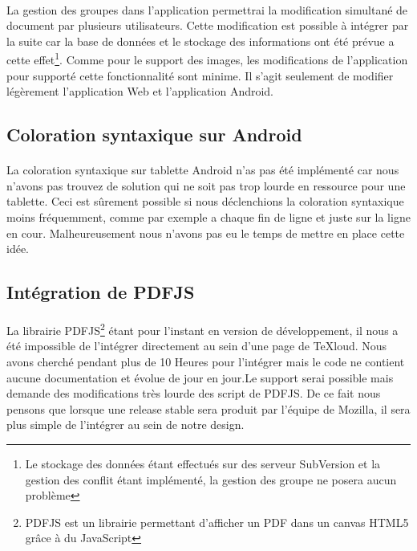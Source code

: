 \documentclass[a4paper,12pt]{article}
\begin{document}
\paragraph*{}
La gestion des groupes dans l'application permettrai la modification simultané de document par plusieurs utilisateurs. Cette modification est possible à intégrer par la suite car la base de données et le stockage des informations ont été prévue a cette effet\footnote{Le stockage des données étant effectués sur des serveur SubVersion et la gestion des conflit étant implémenté, la gestion des groupe ne posera aucun problème}. Comme pour le support des images, les modifications de l'application pour supporté cette fonctionnalité sont minime. Il s'agit seulement de modifier légèrement l'application Web et l'application Android.

\subsection{Coloration syntaxique sur Android}
\paragraph*{}
La coloration syntaxique sur tablette Android n'as pas été implémenté car nous n'avons pas trouvez de solution qui ne soit pas trop lourde en ressource pour une tablette. Ceci est sûrement possible si nous déclenchions la coloration syntaxique moins fréquemment, comme par exemple a chaque fin de ligne et juste sur la ligne en cour. Malheureusement nous n'avons pas eu le temps de mettre en place cette idée.

\subsection{Intégration de PDFJS}
\paragraph*{}
La librairie PDFJS\footnote{PDFJS est un librairie permettant d'afficher un PDF dans un canvas HTML5 grâce à du JavaScript} étant pour l'instant en version de développement, il nous a été impossible de l'intégrer directement au sein d'une page de TeXloud. Nous avons cherché pendant plus de 10 Heures pour l'intégrer mais le code ne contient aucune documentation et évolue de jour en jour.Le support serai possible mais demande des modifications très lourde des script de PDFJS. De ce fait nous pensons que lorsque une release stable sera produit par l'équipe de Mozilla, il sera plus simple de l'intégrer au sein de notre design.
\end{document}
